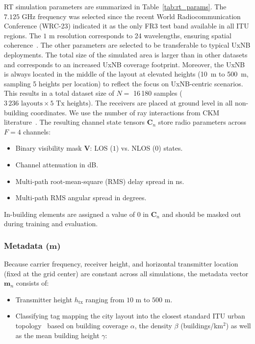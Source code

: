 \documentclass[10pt,conference,letterpaper]{IEEEtran}
\begin{document}
RT simulation parameters are summarized in Table~\ref{tab:rt_params}. The $7.125\text{~GHz}$ frequency was selected since the recent World Radiocommunication Conference (WRC-23) indicated it as the only FR3 test band available in all ITU regions. The $1\text{~m}$ resolution corresponds to 24 wavelengths, ensuring spatial coherence~\cite{saboor26}. The other parameters are selected to be transferable to typical UxNB deployments. The total size of the simulated area is larger than in other datasets~\cite{dataset2212,ckmimagenet2025} and corresponds to an increased UxNB coverage footprint. Moreover, the UxNB is always located in the middle of the layout at elevated heights (10~m to 500~m, sampling 5 heights per location) to reflect the focus on UxNB-centric scenarios. This results in a total dataset size of $N =$ 16\,180 samples ($3\,236 \text{ layouts} \times 5 \text{ Tx heights}$). The receivers are placed at ground level in all non-building coordinates. We use the number of ray interactions from CKM literature~\cite{dataset2212}. The resulting channel state tensors $\mathbf{C}_n$ store radio parameters across $F=4$ channels:
\begin{itemize}
    \item Binary visibility mask $\mathbf{V}$: LOS ($1$) vs. NLOS ($0$) states.
    \item Channel attenuation in dB.
    \item Multi-path root-mean-square (RMS) delay spread in ns.
    \item  Multi-path RMS angular spread in degrees.
\end{itemize}
In-building elements are assigned a value of $0$ in $\mathbf{C}_n$ and should be masked out during training and evaluation.

\subsubsection{Metadata ($\mathbf{m}$)}
\label{sec:metadata}

Because carrier frequency, receiver height, and horizontal transmitter location (fixed at the grid center) are constant across all simulations, the metadata vector $\mathbf{m}_n$ consists of:
\begin{itemize}
    \item Transmitter height $h_{\text{tx}}$ ranging from $10\text{~m}$ to $500\text{~m}$.
    \item Classifying tag mapping the city layout into the closest standard ITU urban topology~\cite{iturp1410} based on building coverage $\alpha$, the density $\beta$ (buildings/km$^2$) as well as the mean building height $\gamma$:
\end{itemize}
\end{document}
